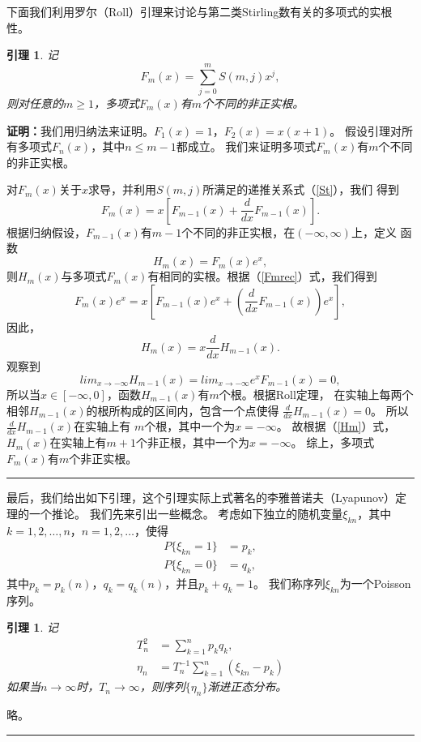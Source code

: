\documentclass[a4paper,11pt,twoside]{book}
\newtheorem{lem}[thm]{引理}
\def\qed{\nopagebreak\hfill{\rule{4pt}{7pt}}\medbreak}
\begin{document}
下面我们利用罗尔（Roll）引理来讨论与第二类Stirling数有关的多项式的实根性。
\begin{lem}\label{Fmroot}
记
\begin{equation}
F_m(x)=\sum\limits_{j=0}^{m}S(m,j)x^j,
\end{equation}
则对任意的$m\geq 1$，多项式$F_m(x)$有$m$个不同的非正实根。
\end{lem}
\noindent
{\bf{证明：}}我们用归纳法来证明。$F_1(x)=1$，$F_2(x)=x(x+1)$。
假设引理对所有多项式$F_n(x)$，其中$n\leq m-1$都成立。
我们来证明多项式$F_m(x)$有$m$个不同的非正实根。

对$F_m(x)$关于$x$求导，并利用$S(m,j)$所满足的递推关系式（\ref{St}），我们
得到
\begin{equation}\label{Fmrec}
F_m(x)=x\left[F_{m-1}(x)+\frac{d}{dx}F_{m-1}(x)\right].
\end{equation}
根据归纳假设，$F_{m-1}(x)$有$m-1$个不同的非正实根，在$(-\infty,\infty)$上，定义
函数
\[
H_m(x)=F_m(x)e^x,
\]
则$H_m(x)$与多项式$F_m(x)$有相同的实根。根据（\ref{Fmrec}）式，我们得到
\[
F_m(x)e^x=x\left[F_{m-1}(x)e^x+\left(\frac{d}{dx}F_{m-1}(x)\right)e^x\right],
\]
因此，
\begin{equation}\label{Hm}
H_m(x)=x\frac{d}{dx}H_{m-1}(x).
\end{equation}
观察到
\[
lim_{x\rightarrow -\infty}H_{m-1}(x)=lim_{x\rightarrow
-\infty}e^xF_{m-1}(x)=0,
\]
所以当$x\in [-\infty,0]$，函数$H_{m-1}(x)$有$m$个根。根据Roll定理，
在实轴上每两个相邻$H_{m-1}(x)$的根所构成的区间内，包含一个点使得
$\frac{d}{dx}H_{m-1}(x)=0$。 所以$\frac{d}{dx}H_{m-1}(x)$在实轴上有
$m$个根，其中一个为$x=-\infty$。
故根据（\ref{Hm}）式，$H_m(x)$在实轴上有$m+1$个非正根，其中一个为$x=-\infty$。
综上，多项式$F_m(x)$有$m$个非正实根。\qed

最后，我们给出如下引理，这个引理实际上式著名的李雅普诺夫（Lyapunov）定理的一个推论。
我们先来引出一些概念。
考虑如下独立的随机变量$\xi_{kn}$，其中$k=1,2,\ldots,n$，$n=1,2,\ldots$，使得
\begin{align*}
P\{\xi_{kn}=1\}&=p_k,\\
P\{\xi_{kn}=0\}&=q_k,
\end{align*}
其中$p_k=p_k(n)$，$q_k=q_k(n)$，并且$p_k+q_k=1$。
我们称序列$\xi_{kn}$为一个Poisson序列。
\begin{lem}\label{Poissona}
记
\begin{align*}
T_n^2&=\sum\limits_{k=1}^{n}p_kq_k,\\
\eta_n&=T_n^{-1}\sum\limits_{k=1}^{n}(\xi_{kn}-p_k)
\end{align*}
如果当$n\rightarrow \infty$时，$T_n\rightarrow
\infty$，则序列$\{\eta_n\}$渐进正态分布。
\end{lem}
 略。\qed
\end{document}

